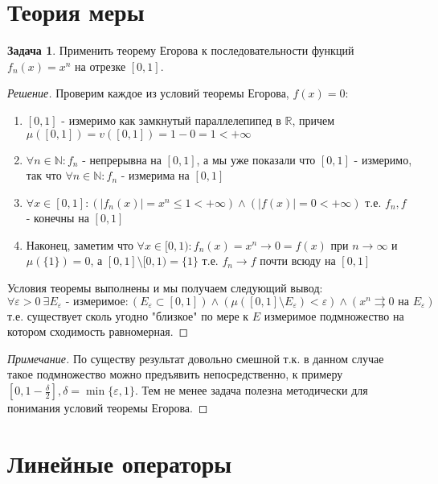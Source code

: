 \documentclass[12pt,a4paper]{article}
\theoremstyle{definition}
\newtheorem{exercise}{Задача}[section]
\newenvironment{solution}
{\renewcommand\qedsymbol{$\blacksquare$}\begin{proof}[Решение]}
{\end{proof}}
\newenvironment{note}
{\renewcommand\qedsymbol{}\begin{proof}[Примечание]}
	{\end{proof}}
\newcommand{\Real}{\mathbb{R}}
\newcommand{\Natural}{\mathbb{N}}
\begin{document}
	\section{Теория меры}
	
	\begin{exercise}
		Применить теорему Егорова к последовательности функций $f_n(x) = x^n$ на отрезке $[0,1]$.
	\end{exercise}
	\begin{solution}
		Проверим каждое из условий теоремы Егорова, $f(x) = 0$:
		\begin{enumerate}
			\item $[0,1]$ - измеримо как замкнутый параллелепипед в $\Real$, причем \newline $\mu([0,1]) = v([0,1]) = 1-0 = 1 < +\infty$
			
			\item $\forall n \in \Natural: f_n \text{ - непрерывна на } [0,1]$, а мы уже показали что $[0,1]$ - измеримо, так что $\forall n \in \Natural: f_n \text{ - измерима на } [0,1]$
			
			\item $\forall x \in [0, 1]: (|f_n(x)| = x^n \leq 1 < +\infty) \wedge (|f(x)| = 0 < +\infty)$ т.е. $f_n, f$ - конечны на $[0,1]$
			
			\item Наконец, заметим что $\forall x \in [0,1): f_n(x) = x^n \to 0 = f(x)$ при $n \to \infty$ и $\mu(\{1\}) = 0$, а $[0,1] \setminus [0,1) = \{1\}$ т.е. $f_n \to f$ почти всюду на $[0,1]$
		\end{enumerate}
	
		Условия теоремы выполнены и мы получаем следующий вывод: $$\forall \varepsilon > 0 \: \exists E_{\varepsilon} \text{ - измеримое}: (E_{\varepsilon} \subset [0,1]) \wedge (\mu([0,1]\setminus E_{\varepsilon}) < \varepsilon) \wedge (x^n \rightrightarrows 0 \text{ на } E_{\varepsilon})$$ т.е. существует сколь угодно "близкое" по мере к $E$ измеримое подмножество на котором сходимость равномерная. 
	\end{solution}
	\begin{note}
		По существу результат довольно смешной т.к. в данном случае такое подмножество можно предъявить непосредственно, к примеру $[0, 1 - \frac{\delta}{2}], \delta = \min\{\varepsilon, 1\}$. Тем не менее задача полезна методически для понимания условий теоремы Егорова.
	\end{note}
	

	\section{Линейные операторы}
	
\end{document}
